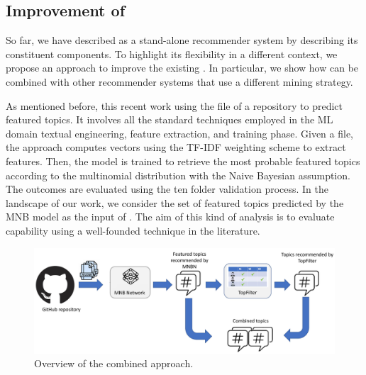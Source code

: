 %
%
%
%

\subsection{Improvement of \MNB} \label{sec:entangled_approach}

So far, we have described \TF as a stand-alone recommender system by describing its constituent components. To highlight its flexibility in a different context, we propose an approach to improve the existing \MNB. %
In particular, we show how \TF can be combined with other recommender systems that use a different mining strategy.

As mentioned before, this recent work using the \RM file of a repository to predict featured topics. It involves all the standard techniques employed in the ML domain \ie textual engineering, feature extraction, and training phase. Given a \RM file, the approach computes vectors using the TF-IDF weighting scheme to extract features. Then, the model is trained to retrieve the most probable featured topics according to the multinomial distribution with the Naive Bayesian assumption. The outcomes are evaluated using the ten folder validation process. In the landscape of our work, we consider the set of featured topics predicted by the MNB model as the input of \TF. The aim of this kind of analysis is to evaluate \TF capability using a well-founded technique in the literature.
\begin{figure}
	\centering
	\includegraphics[width=\linewidth]{figs/entangled}
	\caption{Overview of the combined approach.}
	\label{fig:entangled}
\end{figure}

